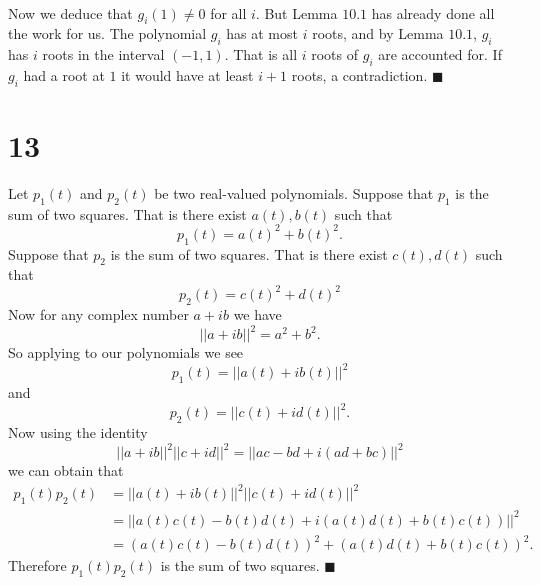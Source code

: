 \documentclass[letterpaper,12pt,oneside,onecolumn]{article}
\newcommand{\1}{\mathbbm{1}}
\begin{document}
\paragraph{}
Now we deduce that $g_i(1) \neq 0$ for all $i$. But Lemma $10.1$ has already done all the work for us. The polynomial $g_i$ has at most $i$ roots, and by Lemma $10.1$, $g_i$ has $i$ roots in the interval $(-1,1)$. That is all $i$ roots of $g_i$ are accounted for. If $g_i$ had a root at $1$ it would have at least $i+1$ roots, a contradiction. $\blacksquare$
\section*{13}
Let $p_1(t)$ and $p_2(t)$ be two real-valued polynomials. Suppose that $p_1$ is the sum of two squares. That is there exist $a(t), b(t)$ such that
$$p_1(t) = a(t)^2 + b(t)^2.$$
Suppose that $p_2$ is the sum of two squares. That is there exist $c(t), d(t)$ such that
$$p_2(t) = c(t)^2 + d(t)^2$$
Now for any complex number $a+ib$ we have
$$||a + ib||^2 = a^2 + b^2.$$
So applying to our polynomials we see
$$p_1(t) = ||a(t) + ib(t)||^2$$
and
$$p_2(t) = ||c(t) + id(t)||^2.$$
Now using the identity
$$||a + ib||^2||c+id||^2 = ||ac - bd + i(ad + bc)||^2$$
we can obtain that
\begin{align*}
p_1(t)p_2(t) &= ||a(t) + ib(t)||^2||c(t) + i d(t)||^2 \\
&= ||a(t)c(t) - b(t)d(t) + i(a(t)d(t) + b(t) c(t))||^2 \\
&= (a(t)c(t) - b(t)d(t))^2 + (a(t)d(t) + b(t)c(t))^2.
\end{align*}
Therefore $p_1(t)p_2(t)$ is the sum of two squares. $\blacksquare$
\end{document}
